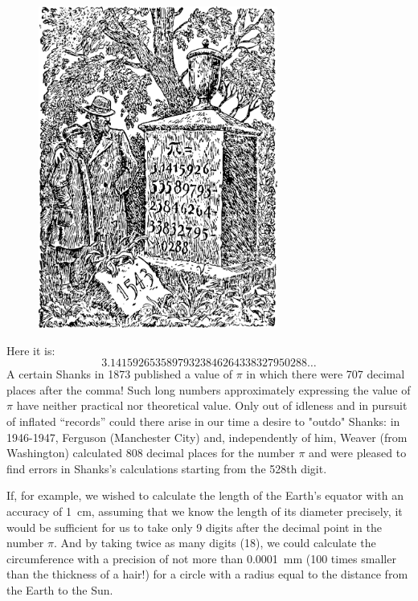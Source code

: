 \begin{figure}[h!]
\centering
\includegraphics[width=0.7\textwidth]{figures/ch-09/fig-123.pdf}
\end{figure}


Here it is: 
\begin{equation*}%
\num{3.14159265358979323846264338327950288}\dots{}
\end{equation*}
A certain Shanks in 1873 published a value of $\pi$ in which there were 707 decimal places after the comma! Such long numbers approximately expressing the value of $\pi$ have neither practical nor theoretical value. Only out of idleness and in pursuit of inflated ``records'' could there arise in our time a desire to "outdo" Shanks: in 1946-1947, Ferguson (Manchester City) and, independently of him, Weaver (from Washington) calculated 808 decimal places for the number $\pi$ and were pleased to find errors in Shanks's calculations starting from the 528th digit.

If, for example, we wished to calculate the length of the Earth's equator with an accuracy of \SI{1}{\centi\meter}, assuming that we know the length of its diameter precisely, it would be sufficient for us to take only 9 digits after the decimal point in the number $\pi$. And by taking twice as many digits (18), we could calculate the circumference with a precision of not more than \SI{0.0001}{\milli\meter} (100 times smaller than the thickness of a hair!) for a circle with a radius equal to the distance from the Earth to the Sun.

